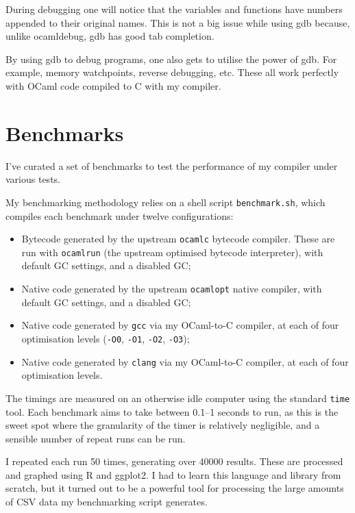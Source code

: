 \documentclass[12pt,a4paper,twoside,openright]{report}
\begin{document}
During debugging one will notice that the variables and functions have numbers
appended to their original names. This is not a big issue while using gdb
because, unlike ocamldebug, gdb has good tab completion.

By using gdb to debug programs, one also gets to utilise the power of gdb. For example,
memory watchpoints, reverse debugging, etc. These all work perfectly with OCaml
code compiled to C with my compiler.

\section{Benchmarks}\label{benchmarks}

I've curated a set of benchmarks to test the performance of my compiler under
various tests.

My benchmarking methodology relies on a shell script \lstinline!benchmark.sh!,
which compiles each benchmark under twelve configurations:
\begin{itemize}
    \item Bytecode generated by the upstream \lstinline!ocamlc! bytecode compiler. These are run with \lstinline!ocamlrun! (the upstream optimised bytecode interpreter), with default GC settings, and a disabled GC;
    \item Native code generated by the upstream \lstinline!ocamlopt! native compiler, with default GC settings, and a disabled GC;
    \item Native code generated by \lstinline!gcc! via my OCaml-to-C compiler, at each of four optimisation levels (\lstinline!-O0!, \lstinline!-O1!, \lstinline!-O2!, \lstinline!-O3!);
    \item Native code generated by \lstinline!clang! via my OCaml-to-C compiler, at each of four optimisation levels.
\end{itemize}

The timings are measured on an otherwise idle computer using the standard \lstinline!time! tool. Each
benchmark aims to take between 0.1--1 seconds to run, as this is the sweet spot
where the granularity of the timer is relatively negligible, and a sensible
number of repeat runs can be run.

I repeated each run 50 times, generating over 40000 results. These are
processed and graphed using R and ggplot2. I had to learn this language and
library from scratch, but it turned out to be a powerful tool for processing
the large amounts of CSV data my benchmarking script generates.
\end{document}
